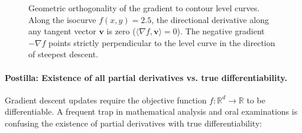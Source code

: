 \begin{figure}[H]
\begin{minipage}{0.48\linewidth}
  \caption{Geometric orthogonality of the gradient to contour level curves. Along the isocurve $f(x, y) = 2.5$, the directional derivative along any tangent vector $\mathbf{v}$ is zero ($\langle \nabla f, \mathbf{v} \rangle = 0$). The negative gradient $-\nabla f$ points strictly perpendicular to the level curve in the direction of steepest descent.}
  \label{fig:gradient_orthogonal_level_curves}
\end{minipage}
\end{figure}

\paragraph{Postilla: Existence of all partial derivatives vs. true differentiability.}
Gradient descent updates require the objective function $f: \mathbb{R}^d \to \mathbb{R}$ to be differentiable. A frequent trap in mathematical analysis and oral examinations is confusing the existence of partial derivatives with true differentiability:

